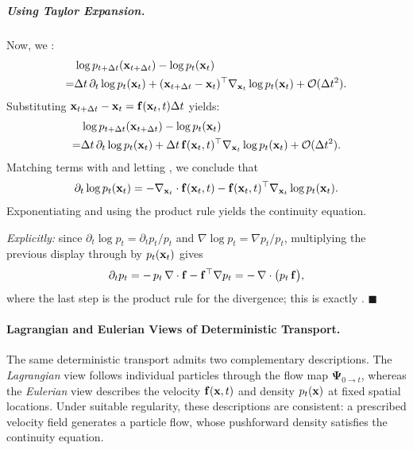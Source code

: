 \subparagraph{Using Taylor Expansion.}
Now, we :
\begin{align*}
    &\log p_{t+\Delta t}({\mathbf{x}}_{t+\Delta t}) 
    - \log p_t({\mathbf{x}}_t) 
    \\= &\Delta t\, \partial_t \log p_t({\mathbf{x}}_t) 
    + ({\mathbf{x}}_{t+\Delta t} - {\mathbf{x}}_t)^\top \nabla_{{\mathbf{x}}_t} \log p_t({\mathbf{x}}_t) 
    + \mathcal{O}(\Delta t^2).
\end{align*}
Substituting ${\mathbf{x}}_{t+\Delta t} - {\mathbf{x}}_t = {\mathbf{f}}({\mathbf{x}}_t, t)\Delta t$ yields:
\begin{align*}
    &\log p_{t+\Delta t}({\mathbf{x}}_{t+\Delta t}) 
    - \log p_t({\mathbf{x}}_t) 
    \\= & \Delta t\, \partial_t \log p_t({\mathbf{x}}_t) 
    + \Delta t\, {\mathbf{f}}({\mathbf{x}}_t, t)^\top \nabla_{{\mathbf{x}}_t} \log p_t({\mathbf{x}}_t) 
    + \mathcal{O}(\Delta t^2).
\end{align*}
Matching terms with  and letting , we conclude that
\begin{equation*}
    \partial_t \log p_t({\mathbf{x}}_t) 
    = - \nabla_{{\mathbf{x}}_t} \cdot {\mathbf{f}}({\mathbf{x}}_t, t) 
    - {\mathbf{f}}({\mathbf{x}}_t, t)^\top \nabla_{{\mathbf{x}}_t} \log p_t({\mathbf{x}}_t).
\end{equation*}
Exponentiating and using the product rule yields the continuity equation.
\begin{nknote}
\noindent\textit{Explicitly:} since $\partial_t \log p_t = \partial_t p_t / p_t$ and $\nabla \log p_t = \nabla p_t / p_t$, multiplying the previous display through by $p_t({\mathbf{x}}_t)$ gives
\[
\partial_t p_t
= -\,p_t\,\nabla\cdot{\mathbf{f}} - {\mathbf{f}}^\top \nabla p_t
= -\,\nabla\cdot\big(p_t\,{\mathbf{f}}\big),
\]
where the last step is the product rule for the divergence; this is exactly . \hfill$\blacksquare$
\end{nknote}


\paragraph{Lagrangian and Eulerian Views of Deterministic Transport.}
The same deterministic transport admits two complementary descriptions.
The \emph{Lagrangian} view follows individual particles through the flow
map $\bm{\Psi}_{0\to t}$, whereas the \emph{Eulerian} view describes the
velocity ${\mathbf{f}}({\mathbf{x}},t)$ and density $p_t({\mathbf{x}})$ at fixed spatial
locations. Under suitable regularity, these descriptions are consistent:
a prescribed velocity field generates a particle flow, whose pushforward
density satisfies the continuity equation.

